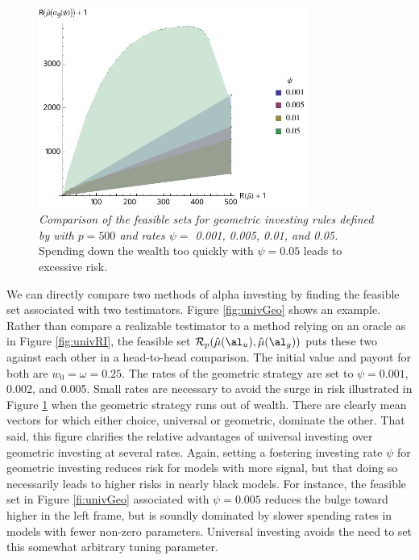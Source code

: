 \documentclass[12pt]{article}
\begin{document}
\begin{figure}
 \caption{ \label{fig:geom} {\sl Comparison of the feasible sets for geometric
 investing rules defined by  with $p=500$ and rates $\psi=$ 0.001,
 0.005, 0.01, and 0.05.}  Spending down the wealth too quickly with $\psi=0.05$
 leads to excessive risk.  }

 \vspace{0.1in}
 \centerline{
   \includegraphics[width=3.5in]{figures/geom}     }
 \vspace{0.2in}
\end{figure}


 We can directly compare two methods of alpha investing by finding the feasible
 set associated with two testimators.  Figure \ref{fig:univGeo} shows an
 example.  Rather than compare a realizable testimator to a method relying on an
 oracle as in Figure \ref{fig:univRI}, the feasible set ${\cal R}_p
 (\hat\mu(\al_u), \hat\mu(\al_g))$ puts these two against each other in a
 head-to-head comparison.  The initial value and payout for both are $w_0 =
 \omega = 0.25$.  The rates of the geometric strategy are set to $\psi=0.001$,
 0.002, and 0.005.  Small rates are necessary to avoid the surge in risk
 illustrated in Figure \ref{fig:geom} when the geometric strategy runs out of
 wealth.  There are clearly mean vectors for which either choice, universal or
 geometric, dominate the other.  That said, this figure clarifies the relative
 advantages of universal investing over geometric investing at several rates.
  Again, setting a fostering investing rate $\psi$ for geometric investing
 reduces risk for models with more signal, but that doing so necessarily leads
 to higher risks in nearly black models.  For instance, the feasible set in
 Figure \ref{fi:univGeo} associated with $\psi = 0.005$ reduces the bulge toward
 higher in the left frame, but is soundly dominated by slower spending rates in
 models with fewer non-zero parameters.  Universal investing avoids the need to
 set this somewhat arbitrary tuning parameter.
\end{document}

